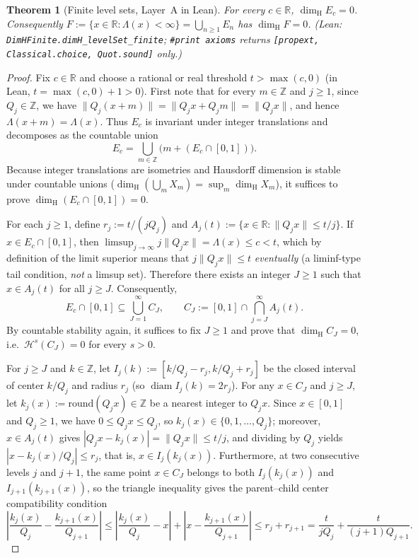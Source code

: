 \documentclass[11pt]{article}
\newtheorem{theorem}{Theorem}
\theoremstyle{definition}
\theoremstyle{remark}
\newcommand{\R}{\mathbb{R}}
\newcommand{\Z}{\mathbb{Z}}
\newcommand{\dimH}{\dim_{\mathrm{H}}}
\newcommand{\Lam}{\Lambda}
\begin{document}
\begin{theorem}[Finite level sets, Layer~A in Lean]\label{thm:finite}
For every $c\in\R$, $\dimH E_c=0$. Consequently
$F:=\{x\in\R:\Lam(x)<\infty\}=\bigcup_{n\ge1}E_n$ has $\dimH F=0$.
(Lean: \texttt{DimHFinite.\allowbreak dimH\_levelSet\_finite}; \texttt{\#print axioms}
returns \texttt{[propext, Classical.choice, Quot.sound]} only.)
\end{theorem}

\begin{proof}
Fix $c\in\R$ and choose a rational or real threshold $t>\max(c,0)$ (in Lean,
$t=\max(c,0)+1>0$). First note that for every $m\in\Z$ and $j\ge1$, since
$Q_j\in\Z$, we have $\|Q_j(x+m)\|=\|Q_jx+Q_jm\|=\|Q_jx\|$, and hence
$\Lam(x+m)=\Lam(x)$. Thus $E_c$ is invariant under integer translations and
decomposes as the countable union
\[
E_c=\bigcup_{m\in\Z}\bigl(m+(E_c\cap[0,1])\bigr).
\]
Because integer translations are isometries and Hausdorff dimension is stable
under countable unions ($\dimH(\bigcup_m X_m)=\sup_m\dimH X_m$), it suffices to
prove $\dimH(E_c\cap[0,1])=0$.

For each $j\ge1$, define $r_j:=t/(jQ_j)$ and
$A_j(t):=\{x\in\R:\|Q_jx\|\le t/j\}$. If $x\in E_c\cap[0,1]$, then
$\limsup_{j\to\infty}j\|Q_jx\|=\Lam(x)\le c<t$, which by definition of the limit
superior means that $j\|Q_jx\|\le t$ \emph{eventually} (a liminf-type tail
condition, \emph{not} a limsup set). Therefore there exists an integer $J\ge1$
such that $x\in A_j(t)$ for all $j\ge J$. Consequently,
\[
E_c\cap[0,1]\subseteq\bigcup_{J=1}^\infty C_J,\qquad
C_J:=[0,1]\cap\bigcap_{j=J}^\infty A_j(t).
\]
By countable stability again, it suffices to fix $J\ge1$ and prove that
$\dimH C_J=0$, i.e.\ $\mathcal H^s(C_J)=0$ for every $s>0$.

For $j\ge J$ and $k\in\Z$, let $I_j(k):=[k/Q_j-r_j,k/Q_j+r_j]$ be the closed
interval of center $k/Q_j$ and radius $r_j$ (so $\operatorname{diam}I_j(k)=2r_j$).
For any $x\in C_J$ and $j\ge J$, let $k_j(x):=\mathrm{round}(Q_jx)\in\Z$ be a
nearest integer to $Q_jx$. Since $x\in[0,1]$ and $Q_j\ge1$, we have
$0\le Q_jx\le Q_j$, so $k_j(x)\in\{0,1,\dots,Q_j\}$; moreover, $x\in A_j(t)$
gives $|Q_jx-k_j(x)|=\|Q_jx\|\le t/j$, and dividing by $Q_j$ yields
$|x-k_j(x)/Q_j|\le r_j$, that is, $x\in I_j(k_j(x))$. Furthermore, at two
consecutive levels $j$ and $j+1$, the same point $x\in C_J$ belongs to both
$I_j(k_j(x))$ and $I_{j+1}(k_{j+1}(x))$, so the triangle inequality gives the
parent--child center compatibility condition
\begin{equation}\label{eq:parent-child-tri}
\left|\frac{k_j(x)}{Q_j}-\frac{k_{j+1}(x)}{Q_{j+1}}\right|
\le\left|\frac{k_j(x)}{Q_j}-x\right|+\left|x-\frac{k_{j+1}(x)}{Q_{j+1}}\right|
\le r_j+r_{j+1}=\frac{t}{jQ_j}+\frac{t}{(j+1)Q_{j+1}}.
\end{equation}


\end{proof}
\end{document}
